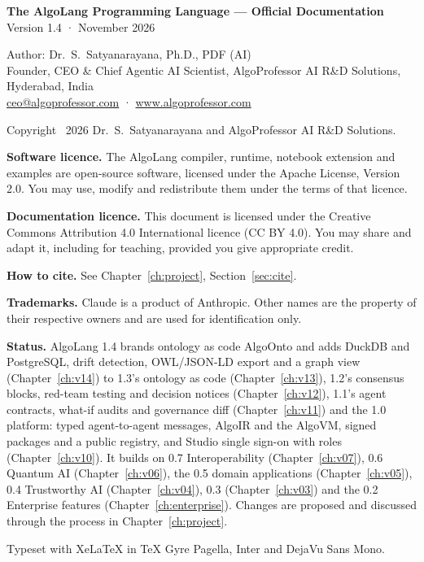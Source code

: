 \documentclass[11pt,oneside,openany]{book}
\begin{document}
\newpage
\vspace*{\fill}
{\small\color{muted}
\textbf{\color{navy}The AlgoLang Programming Language — Official Documentation}\\
Version 1.4 · November 2026

Author: Dr.\ S.\ Satyanarayana, Ph.D., PDF (AI)\\
Founder, CEO \& Chief Agentic AI Scientist, AlgoProfessor AI R\&D Solutions, Hyderabad, India\\
\href{mailto:ceo@algoprofessor.com}{ceo@algoprofessor.com} · \href{https://www.algoprofessor.com}{www.algoprofessor.com}

Copyright \textcopyright\ 2026 Dr.\ S.\ Satyanarayana and AlgoProfessor AI R\&D Solutions.

\textbf{Software licence.} The AlgoLang compiler, runtime, notebook extension and examples are open-source software, licensed under the Apache License, Version 2.0. You may use, modify and redistribute them under the terms of that licence.

\textbf{Documentation licence.} This document is licensed under the Creative Commons Attribution 4.0 International licence (CC BY 4.0). You may share and adapt it, including for teaching, provided you give appropriate credit.

\textbf{How to cite.} See Chapter~\ref{ch:project}, Section~\ref{sec:cite}.

\textbf{Trademarks.} Claude is a product of Anthropic. Other names are the property of their respective owners and are used for identification only.

\textbf{Status.} AlgoLang 1.4 brands ontology as code AlgoOnto\texttrademark{} and adds DuckDB and PostgreSQL, drift detection, OWL/JSON-LD export and a graph view (Chapter~\ref{ch:v14}) to 1.3's ontology as code (Chapter~\ref{ch:v13}), 1.2's consensus blocks, red-team testing and decision notices (Chapter~\ref{ch:v12}), 1.1's agent contracts, what-if audits and governance diff (Chapter~\ref{ch:v11}) and the 1.0 platform: typed agent-to-agent messages, AlgoIR and the AlgoVM, signed packages and a public registry, and Studio single sign-on with roles (Chapter~\ref{ch:v10}). It builds on 0.7 Interoperability (Chapter~\ref{ch:v07}), 0.6 Quantum AI (Chapter~\ref{ch:v06}), the 0.5 domain applications (Chapter~\ref{ch:v05}), 0.4 Trustworthy AI (Chapter~\ref{ch:v04}), 0.3 (Chapter~\ref{ch:v03}) and the 0.2 Enterprise features (Chapter~\ref{ch:enterprise}). Changes are proposed and discussed through the process in Chapter~\ref{ch:project}.

Typeset with XeLaTeX in TeX Gyre Pagella, Inter and DejaVu Sans Mono.\par}
\end{document}
